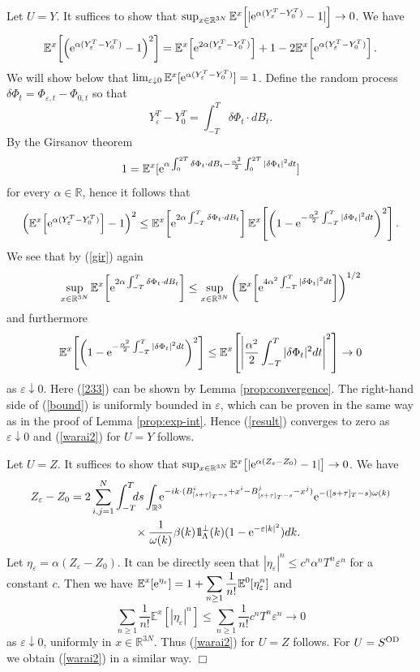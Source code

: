 \documentclass[12pt]{article}
\def\bbbone{{\mathchoice {\rm 1\mskip-4mu l} {\rm 1\mskip-4mu l}
{\rm 1\mskip-4.5mu l} {\rm 1\mskip-5mu l}}}
\def\one{\bbbone}
\newcommand{\kp}{\one_\Lambda^\perp(k)}
\newcommand{\Ebb}{{\mathbb E}}
\providecommand{\eq}[1]{\begin{equation}\label{#1}}
\providecommand{\en}{\end{equation}}
\renewcommand{\d}{\displaystyle}
\providecommand{\qed}{\hfill {$\Box$}\par\medskip}
\providecommand{\BR}{{\mathbb{R}^3 }}
\providecommand{\BRN}{{\mathbb{R}^{3N} }}
\providecommand{\iijj}{\sum_{i,j=1}^N}
\providecommand{\od}{{\rm OD}}
\providecommand{\RR}{\mathbb{R}}
\providecommand{\kak}[1]{(\ref{#1})}
\providecommand{\lk}{\left(}
\providecommand{\rk}{\right)}
\providecommand{\han}{{1/2}}
\providecommand{\e}{{\rm e}}
\providecommand{\1}{\mathbb{1}}
\providecommand{\eps}{\varepsilon}
\newcounter {constant}
\begin{document}
Let $U=Y$. It suffices to show that $\sup_{x\in\BRN}\Ebb^x\!\left[|\e^{\alpha (Y_\eps^T-Y_0^T)}-1|\right]
\to 0$. We have
\eq{ilo}
\Ebb^x\!\left[\lk \e^{\alpha (Y_\eps^T-Y_0^T)}-1\rk^2 \right]=
\Ebb^x\!\left[\e^{2\alpha (Y_\eps^T-Y_0^T)}\right]+
1-2\Ebb^x\!\left[\e^{\alpha (Y_\eps^T-Y_0^T)}\right].
\en
We will show below that $\lim_{\eps\downarrow 0} \Ebb^x[\e^{\alpha (Y_\eps^T-Y_0^T)}]=1$.
Define the random process $\delta \Phi_t=\Phi_{\eps,t}-\Phi_{0,t}$ so that
$$
Y_\eps^T-Y_0^T=\int_{-T}^{T} \delta\Phi_t \cdot dB_t.
$$
By the Girsanov theorem
\eq{gir}
1=\Ebb^x[\e^{\alpha \int_{0}^ {2T} \delta\Phi_t \cdot dB_t -\frac{\alpha^2}{2} \int_{0}^ {2T} |\delta\Phi_t|^2 dt}]
\en
for every $\alpha\in\RR$, hence it follows that
\eq{result}
\lk \Ebb^x\!\left[\e^{\alpha (Y_\eps^T-Y_0^T)} \right]-1\rk^2 \leq
\Ebb^x\!\left[\e^{2\alpha\int_{-T}^{T} \delta\Phi_t \cdot dB_t}\right]
\Ebb^x\!\left[\lk1-\e^{-\frac{\alpha^2}{2}\int_{-T}^{T} |\delta\Phi_t|^2 dt}\rk^2\right].
\en
We see that by \kak{gir} again
\eq{bound}
\sup_{x\in\BRN}\Ebb^x\!\left[\e^{2\alpha\int_{-T}^{T} \delta\Phi_t \cdot dB_t}\right]
\leq
\sup_{x\in\BRN}\lk \Ebb^x\!\left[\e^{4\alpha^2\int_{-T}^{T} |\delta\Phi_t|^2 dt}\right]\rk ^\han
\en
and furthermore
\eq{233}
\Ebb^x\!\left[\lk1-\e^{-\frac{\alpha^2}{2}\int_{-T}^{T} |\delta\Phi_t|^2 dt}\rk^2\right]
\leq
\Ebb^x\!\left[\left|\frac{\alpha^2}{2}\int_{-T}^{T} |\delta\Phi_t|^2dt\right|^2\right]\to 0
\en
as $\eps\downarrow 0$. Here \kak{233}  can be shown by Lemma \ref{prop:convergence}. The right-hand
side of \kak{bound} is uniformly bounded in $\eps$, which can be proven  in the same way as in the
proof of Lemma \ref{prop:exp-int}. Hence \kak{result} converges to zero as $\eps\downarrow 0$ and
\kak{warai2} for $U=Y$ follows.

Let $U=Z$. It suffices to show that $\sup_{x\in\BRN}\Ebb^x\!\left[|\e^{\alpha (Z_\eps-Z_0)}-1|\right]\to 0$.
We have
\begin{align*}
Z_\eps-Z_0
&=
2\iijj \int_{-T}^T
\!\!\!
ds\int_\BR\!\!\!
{\e^{-ik\cdot(B_{[s+\tau]_T-s}^i+x^i-B_{[s+\tau]_T-s}^j-x^j)}\e^{-([s+\tau]_T-s)
\omega(k)}}\\
&\hspace{2cm}\times \frac{1}{\omega(k)}
\beta(k)\kp (1-\e^{-\eps|k|^2})dk.
\end{align*}
Let $\eta_\eps=\alpha (Z_\eps-Z_0)$.
It can be directly seen that
$
\d |\eta_\eps|^n\leq c^n \alpha^n T^n \eps^n
$
for a constant $c$. Then we have $\d \Ebb^x[\e^{\eta_\eps}]=
1+\sum_{n\geq 1}\frac{1}{n!} \Ebb^0[\eta_\eps^n]$ and
$$
\d \sum_{n\geq 1}\frac{1}{n!}  \Ebb^x[|\eta_\eps|^n] \leq \sum_{n\geq 1}\frac{1}{n!}c^n T^n \eps^n\to 0
$$
as $\eps\downarrow 0$, uniformly in $x\in\BRN$. Thus \kak{warai2} for $U=Z$ follows. For $U=S^{\od}$ we obtain
\kak{warai2} in a similar way.
\qed
\end{document}
